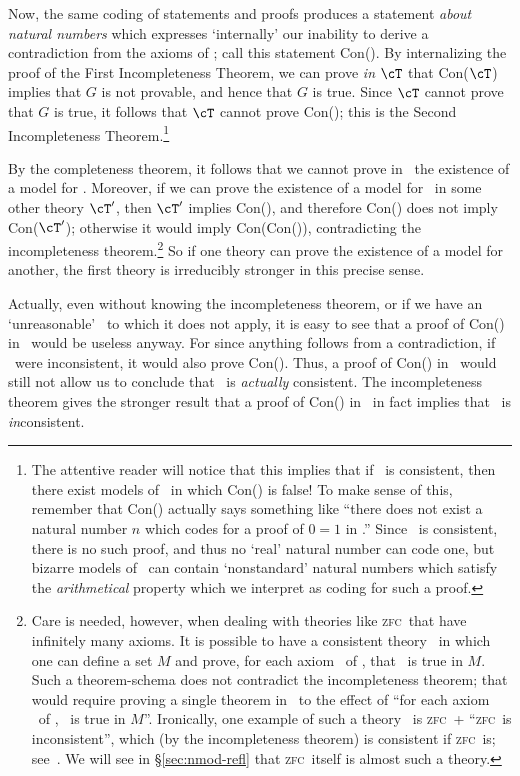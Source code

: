 \documentclass[12pt]{amsart}
\def\zfc{\textsc{zfc}}
\begin{document}
Now, the same coding of statements and proofs produces a statement
\emph{about natural numbers} which expresses `internally' our
inability to derive a contradiction from the axioms of \cT; call
this statement Con(\cT).  By internalizing the proof of the First
Incompleteness Theorem, we can prove \emph{in $\cT$} that
Con($\cT$) implies that $G$ is not provable, and hence that $G$ is
true.  Since $\cT$ cannot prove that $G$ is true, it follows that
$\cT$ cannot prove Con(\cT); this is the Second Incompleteness
Theorem.\footnote{The attentive reader will notice that this implies
  that if \cT\ is consistent, then there exist models of \cT\ in
  which Con(\cT) is false!  To make sense of this, remember that
  Con(\cT) actually says something like ``there does not exist a
  natural number $n$ which codes for a proof of $0=1$ in \cT.''
  Since \cT\ is consistent, there is no such proof, and thus no
  `real' natural number can code one, but bizarre models of \cT\ can
  contain `nonstandard' natural numbers which satisfy the
  \emph{arithmetical} property which we interpret as coding for such a
  proof.}

By the completeness theorem, it follows that we cannot prove in \cT\
the existence of a model for \cT.  Moreover, if we can prove the
existence of a model for \cT\ in some other theory $\cT'$, then $\cT'$
implies Con(\cT), and therefore Con(\cT) does not imply Con($\cT'$);
otherwise it would imply Con(Con(\cT)), contradicting the
incompleteness theorem.\footnote{Care is needed, however, when dealing
  with theories like \zfc\ that have infinitely many axioms.  It is
  possible to have a consistent theory \cT\ in which one can define a
  set $M$ and prove, for each axiom \psi\ of \cT, that \psi\ is true
  in $M$.  Such a theorem-schema does not contradict the
  incompleteness theorem; that would require proving a single theorem
  in \cT\ to the effect of ``for each axiom \psi\ of \cT, \psi\ is
  true in $M$''.  Ironically, one example of such a theory \cT\ is
  \zfc\ + ``\zfc\ is inconsistent'', which (by the incompleteness
  theorem) is consistent if \zfc\ is;
  see~\cite[IV.10]{kunen:set-theory}.  We will see in
  \S\ref{sec:nmod-refl} that \zfc\ itself is almost such a
  theory.\label{fn:inf-ax}} So if one theory can prove the existence
of a model for another, the first theory is irreducibly stronger in
this precise sense.

\begin{rmk}
  Actually, even without knowing the incompleteness theorem, or if we
  have an `unreasonable' \cT\ to which it does not apply, it is easy
  to see that a proof of Con(\cT) in \cT\ would be useless anyway.
  For since anything follows from a contradiction, if \cT\ were
  inconsistent, it would also prove Con(\cT).  Thus, a proof of
  Con(\cT) in \cT\ would still not allow us to conclude that \cT\ is
  \emph{actually} consistent.  The incompleteness theorem gives the
  stronger result that a proof of Con(\cT) in \cT\ in fact implies
  that \cT\ is \emph{in}consistent.
\end{rmk}
\end{document}
